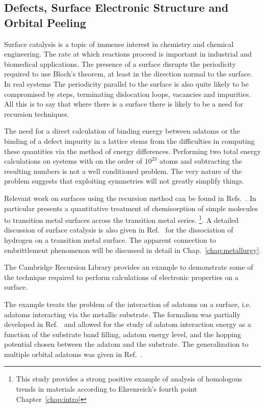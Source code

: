 \subsection{Defects, Surface Electronic Structure and Orbital Peeling}
Surface catalysis is a topic of immense interest in chemistry and chemical engineering.
The rate at which reactions proceed is important in industrial and biomedical 
applications. The presence of a surface disrupts the periodicity required to use Bloch's theorem,
at least in the direction normal to the surface. In real systems
The periodicity parallel to the surface is also quite likely to 
be compromised by steps, terminating dislocation loops, 
vacancies and impurities. All this is to say that where 
there is a surface there is likely to be a need for recursion
techniques.

The need for a direct calculation of binding energy between adatoms or
the binding of a defect impurity in a lattice stems from the difficulties in computing 
these quantities via the method of energy differences. Performing two total
energy calculations on systems with on the order of $10^{23}$ atoms and subtracting the
resulting numbers is not a well conditioned problem. 
The very nature of the problem suggests that exploiting symmetries
will not greatly simplify things.

Relevant work on surfaces using the recursion method can be found in 
Refs.~\cite{haydock72, kelly73, kelly74, kelly74b, burke76, haydock79, haydock82}.
In particular \cite{haydock79} presents a quantitative treatment of chemisorption of simple
molecules to transition metal surfaces across the transition metal series. 
\footnote{This study provides a strong positive example of analysis of homologous 
trends in materials according to Ehrenreich's fourth point Chapter~\ref{chap:intro}}.
A detailed discussion of surface catalysis is also given in Ref.~\cite{haydock80}
for the dissociation of hydrogen on a transition metal surface. The apparent
connection to embrittlement phenomenon will be discussed in detail in Chap.~\ref{chap:metallurgy}.

The Cambridge Recursion Library provides an example 
to demonstrate some of the technique required to perform 
calculations of electronic properties on a surface. 

The example treats the problem of the interaction of adatoms on a 
surface, i.e. adatoms interacting via the metallic substrate.
The formalism was partially developed in Ref.~\cite{einstein73} and 
allowed for the study of adatom interaction energy 
as a function of the substrate band filling, adatom energy level, and the hopping
potential chosen between the adatom and the substrate. The generalization
to multiple orbital adatoms was given in Ref.~\cite{burke76}. 

